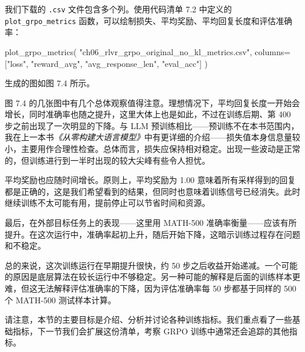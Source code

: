 我们下载的 \texttt{.csv} 文件包含多个列。使用代码清单 7.2 中定义的 \texttt{plot\_grpo\_metrics} 函数，可以绘制损失、平均奖励、平均回复长度和评估准确率：

\begin{codebox}
plot_grpo_metrics(
    "ch06_rlvr_grpo_original_no_kl_metrics.csv",
    columns=["loss", "reward_avg", "avg_response_len", "eval_acc"]
)
\end{codebox}

生成的图如图 7.4 所示。


图 7.4 的几张图中有几个总体观察值得注意。理想情况下，平均回复长度一开始会增长，同时准确率也随之提升，这里大体上也是如此，不过在训练后期、第 400 步之前出现了一次明显的下降。与 LLM 预训练相比——预训练不在本书范围内，我在上一本书\emph{《从零构建大语言模型》}中有更详细的介绍——损失值本身信息量较小，主要用作合理性检查。总体而言，损失应保持相对稳定。出现一些波动是正常的，但训练进行到一半时出现的较大尖峰有些令人担忧。

平均奖励也应随时间增长。原则上，平均奖励为 1.00 意味着所有采样得到的回复都是正确的，这是我们希望看到的结果，但同时也意味着训练信号已经消失。此时继续训练不太可能有用，提前停止可以节省时间和资源。

最后，在外部目标任务上的表现——这里用 MATH-500 准确率衡量——应该有所提升。在这次运行中，准确率起初上升，随后开始下降，这暗示训练过程存在问题和不稳定。

总的来说，这次训练运行在早期提升很快，约 50 步之后收益开始递减。一个可能的原因是底层算法在较长运行中不够稳定。另一种可能的解释是后面的训练样本更难，但这无法解释评估准确率的下降，因为评估准确率每 50 步都基于同样的 500 个 MATH-500 测试样本计算。

请注意，本节的主要目标是介绍、分析并讨论各种训练指标。我们重点看了一些基础指标，下一节我们会扩展这份清单，考察 GRPO 训练中通常还会追踪的其他指标。

